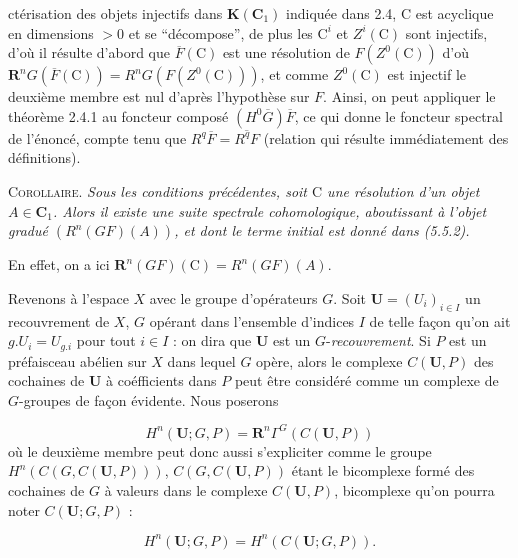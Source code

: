 \clearpage
{}

\noindent ctérisation des objets injectifs dans $\mathbf K({\mathbf C}_1)$ indiquée dans 2.4, $\mathrm C$ est
acyclique en dimensions $>0$ et se ``décompose'', de plus les $\mathrm C^i$ et $Z^i(\mathrm C)$
sont injectifs, d'où il résulte d'abord que $\overline F(\mathrm C)$ est une résolution
de $F(Z^0(\mathrm C))$ d'où ${\mathbf R}^nG(\overline F(\mathrm C))=R^nG(F(Z^0(\mathrm C)))$, et comme $Z^0(\mathrm C)$
est injectif le deuxième membre est nul d'après l'hypothèse sur $F$. Ainsi, on
peut appliquer le théorème 2.4.1 au foncteur composé
$(H^0\overline G)\overline F$, ce qui donne le foncteur spectral de l'énoncé,
compte tenu que $R^q\overline F=\overline{R^qF}$ (relation qui résulte
immédiatement des définitions).

\textsc{Corollaire.} \textit{Sous les conditions précédentes, soit $\mathrm C$
une résolution d'un objet $A\in {\mathbf C}_1$. Alors il existe une suite spectrale
cohomologique, aboutissant à l'objet gradué $(R^n(GF)(A))$, et dont le terme
initial est donné dans \textup{(5.5.2)}.}

En effet, on a ici ${\mathbf R}^n(GF)(\mathrm C)=R^n(GF)(A)$.

Revenons à l'espace $X$ avec le groupe d'opérateurs $G$. Soit
${\mathbf U}=(U_i)_{i\in I}$ un recouvrement de $X$, $G$ opérant dans l'ensemble
d'indices $I$ de telle façon qu'on ait $g. U_i=U_{g. i}$ pour tout
$i\in I$ : on dira que ${\mathbf U}$ est un $G$-\textit{recouvrement}. Si $P$ est un
préfaisceau abélien sur $X$ dans lequel $G$ opère, alors le complexe
$C({\mathbf U},P)$ des cochaines de ${\mathbf U}$ à coéfficients dans $P$ peut
être considéré comme un complexe de $G$-groupes de façon évidente. Nous
poserons

\[
\tag{5.5.3}
H^n({\mathbf U};G,P)={\mathbf R}^n\Gamma^G(C({\mathbf U},P))
\]
où le deuxième membre peut donc aussi s'expliciter comme le groupe
$H^n(C(G,C({\mathbf U},P)))$, $C(G,C({\mathbf U},P))$ étant le bicomplexe formé
des cochaines de $G$ à valeurs dans le complexe $C({\mathbf U},P)$, bicomplexe
qu'on pourra noter $C({\mathbf U};G,P)$ :

\[
\tag{5.5.3 bis}
H^n({\mathbf U};G,P)=H^n(C({\mathbf U};G,P)).
\]

